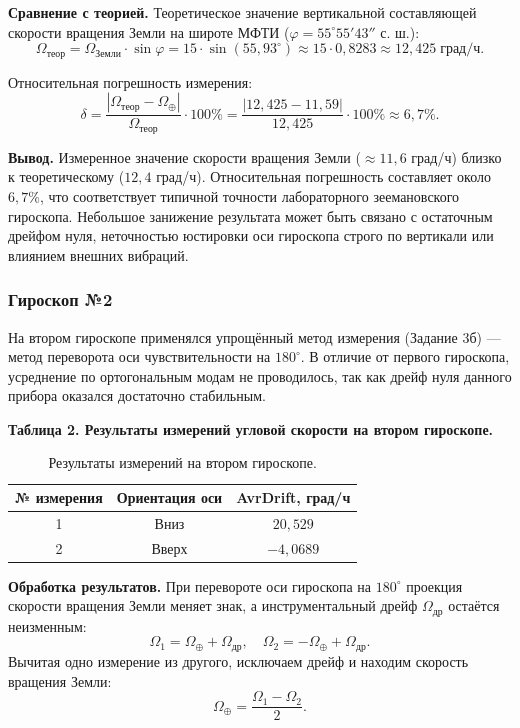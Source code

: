 \documentclass[12pt, a4paper]{article}
\begin{document}
\textbf{Сравнение с теорией.} Теоретическое значение вертикальной составляющей скорости вращения Земли на широте МФТИ ($\varphi = 55^\circ 55' 43''$ с. ш.):
\begin{equation}
    \Omega_{\text{теор}} = \Omega_{\text{Земли}} \cdot \sin\varphi = 15 \cdot \sin(55{,}93^\circ) \approx 15 \cdot 0{,}8283 \approx 12{,}425 \; \text{град/ч}.
\end{equation}

Относительная погрешность измерения:
\begin{equation}
    \delta = \frac{|\Omega_{\text{теор}} - \Omega_{\oplus}|}{\Omega_{\text{теор}}} \cdot 100\% = \frac{|12{,}425 - 11{,}59|}{12{,}425} \cdot 100\% \approx 6{,}7\%.
\end{equation}

\textbf{Вывод.} Измеренное значение скорости вращения Земли ($\approx 11{,}6$ град/ч) близко к теоретическому ($12{,}4$ град/ч). Относительная погрешность составляет около $6{,}7\%$, что соответствует типичной точности лабораторного зеемановского гироскопа. Небольшое занижение результата может быть связано с остаточным дрейфом нуля, неточностью юстировки оси гироскопа строго по вертикали или влиянием внешних вибраций.

\subsubsection*{Гироскоп №2}

На втором гироскопе применялся упрощённый метод измерения (Задание 3б) --- метод переворота оси чувствительности на $180^\circ$. В отличие от первого гироскопа, усреднение по ортогональным модам не проводилось, так как дрейф нуля данного прибора оказался достаточно стабильным.

\textbf{Таблица 2. Результаты измерений угловой скорости на втором гироскопе.}

\begin{table}[H]
\centering
\begin{tabular}{|c|c|c|}
\hline
\textbf{№ измерения} & \textbf{Ориентация оси} & \textbf{AvrDrift, град/ч} \\
\hline
1 & Вниз & $20{,}529$ \\
\hline
2 & Вверх & $-4{,}0689$ \\
\hline
\end{tabular}
\caption{Результаты измерений на втором гироскопе.}
\label{tab:gyro2}
\end{table}

\textbf{Обработка результатов.} При перевороте оси гироскопа на $180^\circ$ проекция скорости вращения Земли меняет знак, а инструментальный дрейф $\Omega_{\text{др}}$ остаётся неизменным:
\begin{equation}
    \Omega_1 = \Omega_{\oplus} + \Omega_{\text{др}}, \quad \Omega_2 = -\Omega_{\oplus} + \Omega_{\text{др}}.
\end{equation}
Вычитая одно измерение из другого, исключаем дрейф и находим скорость вращения Земли:
\begin{equation}
    \Omega_{\oplus} = \frac{\Omega_1 - \Omega_2}{2}.
\end{equation}
\end{document}
